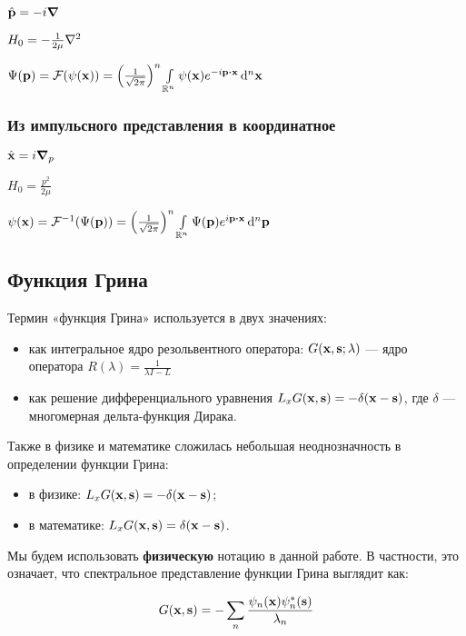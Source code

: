 $\hat{\vb{p}} = -i \grad$

$H_0 = - \frac{1}{2 \mu} \laplacian$

$\Psi(\vb{p}) = \mcF(\psi(\vb{x})) = \left(\frac{1}{\sqrt{2 \pi}}\right)^n \int\limits_{\bbR^n} \psi(\vb{x}) e^{-i \vb{p} \vdot \vb{x}} \dd[n]{\vb{x}}$

\subsubsection{Из импульсного представления в координатное}

$\hat{\vb{x}} = i \grad_p$

$H_0 = \frac{p^2}{2 \mu}$

$\psi(\vb{x}) = \mcF^{-1}(\Psi(\vb{p})) = \left(\frac{1}{\sqrt{2 \pi}}\right)^n \int\limits_{\bbR^n} \Psi(\vb{p}) e^{i \vb{p} \vdot \vb{x}} \dd[n]{\vb{p}}$

\subsection{Функция Грина}
Термин «функция Грина» используется в двух значениях:

\begin{itemize}
\item как интегральное ядро резольвентного оператора: $G(\vb{x}, \vb{s}; \lambda)$ — ядро оператора $R(\lambda) = \frac{1}{\lambda I - L}$ 
\item как решение дифференциального уравнения $L_x G(\vb{x}, \vb{s}) = -\delta(\vb{x} - \vb{s})$, где $\delta$ — многомерная дельта-функция Дирака.
\end{itemize}

Также в физике и математике сложилась небольшая неоднозначность в определении функции Грина:

\begin{itemize}
\item в физике: $L_x G(\vb{x}, \vb{s}) = -\delta(\vb{x} - \vb{s})$;
\item в математике: $L_x G(\vb{x}, \vb{s}) = \delta(\vb{x} - \vb{s})$.
\end{itemize} 

Мы будем использовать \textbf{физическую} нотацию в данной работе. В частности, это означает, что спектральное представление функции Грина выглядит как: 

\[
G(\vb{x}, \vb{s}) = -\sum\limits_n \frac{\psi_n(\vb{x}) \psi_n^*(\vb{s})}{\lambda_n}
\]

